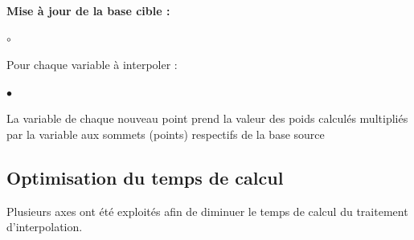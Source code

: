 \vspace{0.4cm}

\textbf{Mise à jour de la base cible :}
\begin{list}{$\circ$}{\leftmargin=0.5cm  \itemsep=0cm}
    \item Pour chaque variable à interpoler :
    \begin{list}{$\bullet$}{\leftmargin=0.5cm  \itemsep=0cm}
        \item La variable de chaque nouveau point prend la valeur des poids calculés multipliés par la variable aux sommets (points) respectifs de la base source
    \end{list}
\end{list}




\subsection{Optimisation du temps de calcul}

Plusieurs axes ont été exploités afin de diminuer le temps de calcul du traitement d'interpolation.


